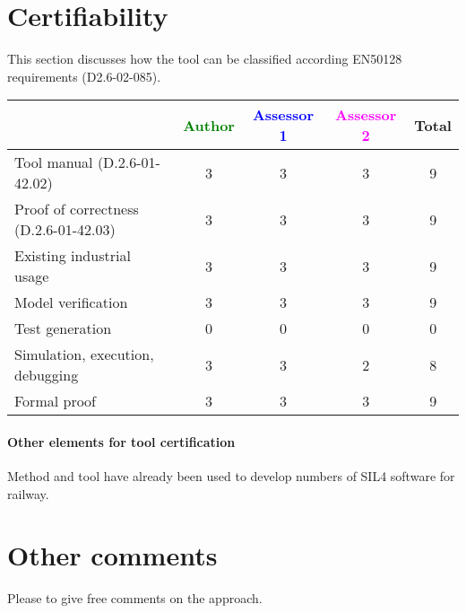 \section{Certifiability}

This section discusses how the tool can be classified according EN50128 requirements (D2.6-02-085).


\begin{tabular}{|l | c | c | c | c|}
\hline
& \textcolor{green}{Author} & \textcolor{blue}{Assessor 1} & \textcolor{magenta}{Assessor 2} & Total \\
\hline 
Tool manual (D.2.6-01-42.02) & 3 & 3 & 3 & 9 \\
\hline
Proof of correctness (D.2.6-01-42.03)   & 3 & 3 & 3 & 9 \\
\hline
Existing industrial  usage  & 3  & 3 & 3 & 9 \\
\hline
Model verification & 3 & 3 & 3 & 9 \\
\hline
Test generation & 0 & 0 & 0 & 0 \\
\hline
Simulation, execution, debugging & 3 & 3 & 2 & 8 \\
\hline
Formal proof & 3 & 3 & 3 & 9 \\
\hline
\end{tabular}

\paragraph{Other elements for tool certification}


\begin{author_comment}
Method and tool have already been used to  develop numbers of  SIL4 software for railway.
\end{author_comment}


\section{Other comments}
Please to  give free comments on the approach.
